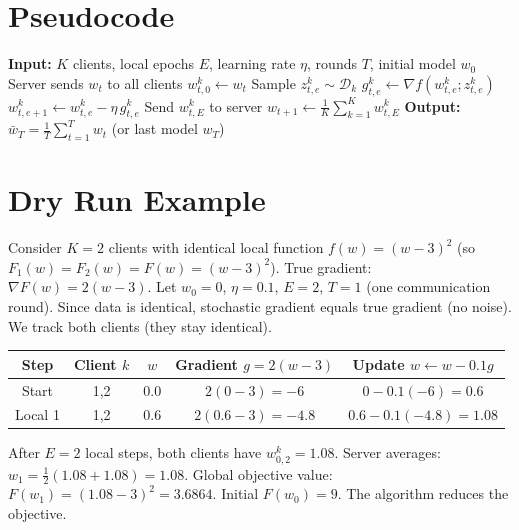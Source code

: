 \documentclass{article}
\begin{document}
\section*{Pseudocode}
\begin{algorithm}
\caption{Federated Averaging (FedAvg)}
\begin{algorithmic}
\STATE \textbf{Input:} $K$ clients, local epochs $E$, learning rate $\eta$, rounds $T$, initial model $w_0$
    \STATE Server sends $w_t$ to all clients
        \STATE $w_{t,0}^k \gets w_t$
            \STATE Sample $z_{t,e}^k \sim \mathcal{D}_k$
            \STATE $g_{t,e}^k \gets \nabla f(w_{t,e}^k; z_{t,e}^k)$
            \STATE $w_{t,e+1}^k \gets w_{t,e}^k - \eta \, g_{t,e}^k$
        \ENDFOR
        \STATE Send $w_{t,E}^k$ to server
    \ENDFOR
    \STATE $w_{t+1} \gets \frac{1}{K}\sum_{k=1}^K w_{t,E}^k$
\ENDFOR
\STATE \textbf{Output:} $\bar{w}_T = \frac{1}{T}\sum_{t=1}^T w_t$ (or last model $w_T$)
\end{algorithmic}
\end{algorithm}

\section*{Dry Run Example}
Consider $K=2$ clients with identical local function $f(w) = (w-3)^2$ (so $F_1(w)=F_2(w)=F(w)=(w-3)^2$). True gradient: $\nabla F(w) = 2(w-3)$. Let $w_0 = 0$, $\eta = 0.1$, $E=2$, $T=1$ (one communication round). Since data is identical, stochastic gradient equals true gradient (no noise). We track both clients (they stay identical).

\begin{center}
\begin{tabular}{c c c c c}
\toprule
Step & Client $k$ & $w$ & Gradient $g = 2(w-3)$ & Update $w \gets w - 0.1 g$ \\
\midrule
Start & 1,2 & $0.0$ & $2(0-3) = -6$ & $0 - 0.1(-6) = 0.6$ \\
Local 1 & 1,2 & $0.6$ & $2(0.6-3) = -4.8$ & $0.6 - 0.1(-4.8) = 1.08$ \\
\bottomrule
\end{tabular}
\end{center}
After $E=2$ local steps, both clients have $w_{0,2}^k = 1.08$. Server averages: $w_1 = \frac{1}{2}(1.08 + 1.08) = 1.08$. Global objective value: $F(w_1) = (1.08-3)^2 = 3.6864$. Initial $F(w_0)=9$. The algorithm reduces the objective.
\end{document}
